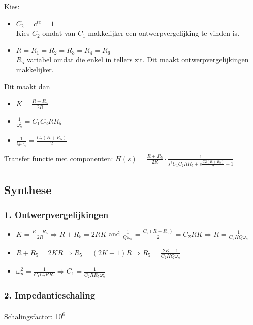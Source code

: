 \documentclass[]{article}
\begin{document}
Kies:

\begin{itemize}
\item
  \(C_2 = c^{te} = 1\)\\
  Kies \(C_2\) omdat van \(C_1\) makkelijker een ontwerpvergelijking te
  vinden is.
\item
  \(R = R_1 = R_2 = R_3 = R_4 = R_6\)\\
  \(R_5\) variabel omdat die enkel in tellers zit. Dit maakt
  ontwerpvergelijkingen makkelijker.
\end{itemize}

Dit maakt dan

\begin{itemize}
\item
  \(K = \frac{R+R_5}{2R}\)
\item
  \(\frac{1}{\omega_n^2} = C_1C_2RR_5\)
\item
  \(\frac{1}{Q\omega_n}=\frac{C_2(R+R_5)}{2}\)
\end{itemize}

Transfer functie met componenten:
\(H(s) = \frac{R+R_5}{2R} \cdot \frac{1}{s^2C_1C_2RR_5+s\frac{C2(R+R_5)}{2}+1}\)

\hypertarget{header-n5420}{%
\subsection{Synthese}\label{header-n5420}}

\hypertarget{header-n5421}{%
\subsubsection{1. Ontwerpvergelijkingen}\label{header-n5421}}

\begin{itemize}
\item
  \(K = \frac{R+R_5}{2R} \Rightarrow R + R_5 = 2RK\) and
  \(\frac{1}{Q\omega_n} = \frac{C_2(R+R_5)}{2} = C_2RK \Rightarrow R = \frac{1}{C_2KQ\omega_n}\)
\item
  \(R+R_5 = 2KR \Rightarrow R_5 = (2K-1)R \Rightarrow R_5 = \frac{2K-1}{C_2KQ\omega_n}\)
\item
  \(\omega_n^2=\frac{1}{C_1C_2RR_5} \Rightarrow C_1 = \frac{1}{C_2RR_5\omega_n^2}\)
\end{itemize}

\hypertarget{header-n5432}{%
\subsubsection{2. Impedantieschaling}\label{header-n5432}}

Schalingsfactor: 10\textsuperscript{6}
\end{document}
